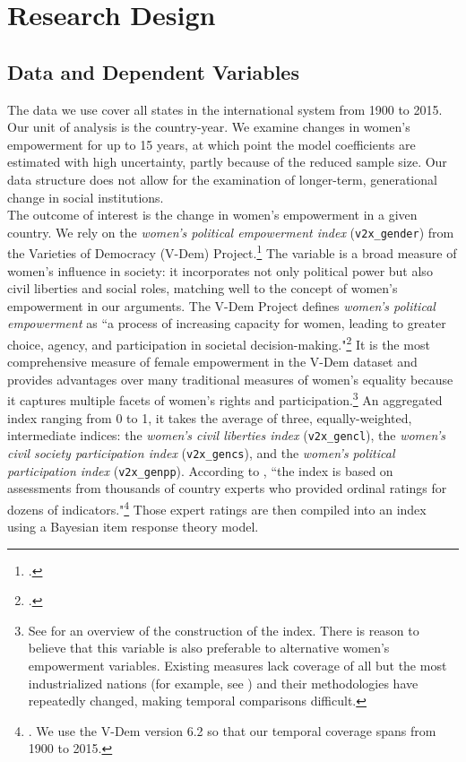 \documentclass [12pt] {article}
\begin{document}
\section*{Research Design}
\label{design}
\subsection*{Data and Dependent Variables}
\vspace*{.2in}

The data we use cover all states in the international system from 1900 to 2015.  Our unit of analysis is the country-year. We examine changes in women's empowerment for up to 15 years, at which point the model coefficients are estimated with high uncertainty, partly because of the reduced sample size. Our data structure does not allow for the examination of longer-term, generational change in social institutions. \\

The outcome of interest is the change in women's empowerment in a given country. We rely on the {\it women's political empowerment index} (\verb`v2x_gender`) from the Varieties of Democracy (V-Dem) Project.\footnote{.} The variable is a broad measure of women's influence in society: it incorporates not only political power but also civil liberties and social roles, matching well to the concept of women's empowerment in our arguments. The V-Dem Project defines {\it women's political empowerment} as ``a process of increasing capacity for women, leading to greater choice, agency, and participation in societal decision-making."\footnote{.} It is the most comprehensive measure of female empowerment in the V-Dem dataset and provides advantages over many traditional measures of women's equality because it captures multiple facets of women's rights and participation.\footnote{See  for an overview of the construction of the index. There is reason to believe that this variable is also preferable to alternative women's empowerment variables. Existing measures lack coverage of all but the most industrialized nations (for example,  see ) and their methodologies have repeatedly changed, making temporal comparisons difficult.} An aggregated index ranging from 0 to 1, it takes the average of three, equally-weighted, intermediate indices: the {\it women's civil liberties index} (\verb`v2x_gencl`), the {\it women's civil society participation index} (\verb`v2x_gencs`), and the {\it women's political participation index} (\verb`v2x_genpp`). According to \citeauthor{sundstrom2017women}, ``the index is based on assessments from thousands of country experts who provided ordinal  ratings for dozens of indicators."\footnote{. We use the V-Dem version 6.2 so that our temporal coverage spans from 1900 to 2015.} Those expert ratings are then compiled into an index using a  Bayesian item response theory model. \\
\end{document}
